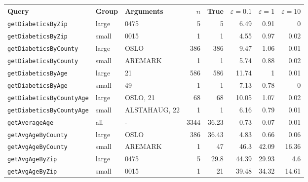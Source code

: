 \begin{tabular}{lllrrrrr}
\hline
Query & Group & Arguments & $n$ & True & $\varepsilon=0.1$ & $\varepsilon=1$ & $\varepsilon=10$ \\
\hline
\texttt{getDiabeticsByZip} & large & 0475 & 5 & 5 & 6.49 & 0.91 & 0 \\
\texttt{getDiabeticsByZip} & small & 0015 & 1 & 1 & 4.55 & 0.97 & 0.02 \\
\texttt{getDiabeticsByCounty} & large & OSLO & 386 & 386 & 9.47 & 1.06 & 0.01 \\
\texttt{getDiabeticsByCounty} & small & AREMARK & 1 & 1 & 5.74 & 0.88 & 0.02 \\
\texttt{getDiabeticsByAge} & large & 21 & 586 & 586 & 11.74 & 1 & 0.01 \\
\texttt{getDiabeticsByAge} & small & 49 & 1 & 1 & 7.13 & 0.78 & 0 \\
\texttt{getDiabeticsByCountyAge} & large & OSLO, 21 & 68 & 68 & 10.05 & 1.07 & 0.02 \\
\texttt{getDiabeticsByCountyAge} & small & ALSTAHAUG, 22 & 1 & 1 & 6.16 & 0.79 & 0.01 \\
\texttt{getAverageAge} & all & - & 3344 & 36.23 & 0.73 & 0.07 & 0.01 \\
\texttt{getAvgAgeByCounty} & large & OSLO & 386 & 36.43 & 4.83 & 0.66 & 0.06 \\
\texttt{getAvgAgeByCounty} & small & AREMARK & 1 & 47 & 46.3 & 42.09 & 16.36 \\
\texttt{getAvgAgeByZip} & large & 0475 & 5 & 29.8 & 44.39 & 29.93 & 4.6 \\
\texttt{getAvgAgeByZip} & small & 0015 & 1 & 21 & 39.48 & 34.32 & 14.61 \\
\hline
\end{tabular}
